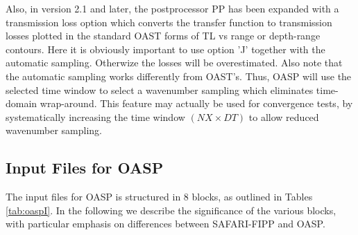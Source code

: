 Also, in version 2.1 and later, the postprocessor PP has been expanded
with a transmission loss option which converts the transfer function
to transmission losses plotted in the standard OAST forms of TL vs
range or depth-range contours. Here it is obviously important to use option 'J'
together with the automatic sampling. Otherwize the losses will be
overestimated. Also note that the automatic sampling works differently
from OAST's. Thus, OASP will use the selected time window to select a
wavenumber sampling which eliminates time-domain wrap-around. This
feature may actually be used for convergence tests, by systematically
increasing the time window $ (NX \times DT) $ to allow reduced
wavenumber sampling.
  
\subsection{Input Files for OASP}

The input files for OASP is structured in 8 blocks, as outlined in
Tables\,\ref{tab:oaspI}. In the following we
describe the significance of the various blocks, with particular
emphasis on differences between SAFARI-FIPP and OASP. 

